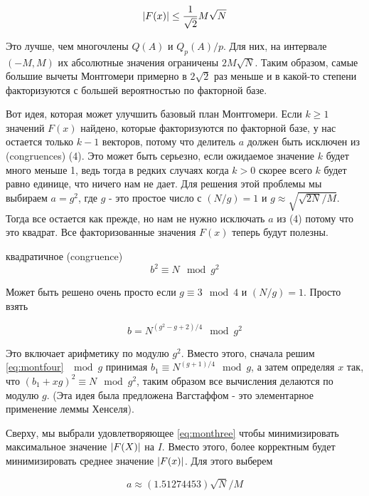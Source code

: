 \documentclass[russian, utf8, a4paper,12pt]{report}
\DeclarePairedDelimiter\abs{\lvert}{\rvert}%
\begin{document}
\begin{equation*}
\abs{F(x)} \leq \frac{1}{\sqrt{2}}M\sqrt{N}
\end{equation*}

Это лучше, чем многочлены $Q(A)$ и $Q_p(A)/p$. Для них, на интервале $(-M, M)$ их абсолютные значения ограничены $2M\sqrt{N}$. Таким образом, самые большие вычеты Монтгомери примерно в $2\sqrt{2}$ раз меньше и в какой-то степени факторизуются с большей вероятностью по факторной базе.

Вот идея, которая может улучшить базовый план Монтгомери. Если $k \geq 1$ значений $F(x)$ найдено, которые факторизуются по факторной базе, у нас остается только $k - 1$ векторов, потому что делитель $a$ должен быть исключен из (congruences) (4). Это может быть серьезно, если ожидаемое значение $k$ будет много меньше 1, ведь тогда в редких случаях когда $k > 0$ скорее всего $k$ будет равно единице, что ничего нам не дает. Для решения этой проблемы мы выбираем $a = g^2$, где $g$ - это простое число с $(N/g) = 1$ и $g \approx \sqrt{\sqrt{2N}/M}$. Тогда все остается как прежде, но нам не нужно исключать $a$ из (4) потому что это квадрат. Все факторизованные значения $F(x)$ теперь будут полезны.

квадратичное (congruence)
\begin{equation}\label{eq:montfour}
b^2 \equiv N \mod g^2
\end{equation}

Может быть решено очень просто если $g \equiv 3 \mod 4$ и $(N/g) = 1$. Просто взять

\begin{equation*}
b = N^{(g^2 - g + 2)/4} \mod g^2
\end{equation*}

Это включает арифметику по модулю $g^2$. Вместо этого, сначала решим \eqref{eq:montfour} $\mod g$ принимая $b_1 \equiv N^{(g + 1)/4} \mod g$, а затем определяя $x$ так, что $(b_1 + xg)^2 \equiv N \mod g^2$, таким образом все вычисления делаются по модулю $g$. (Эта идея была предложена Вагстаффом - это элементарное применение леммы Хенселя).

Сверху, мы выбрали удовлетворяющее \eqref{eq:monthree} чтобы минимизировать максимальное значение $\abs{F(X)}$ на $I$. Вместо этого, более корректным будет минимизировать среднее значение $\abs{F(x)}$. Для этого выберем

\begin{equation*}
a \approx (1.51274453)\sqrt{N}/M
\end{equation*}
\end{document}
